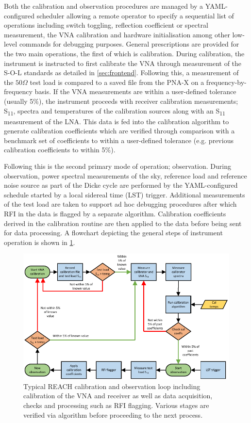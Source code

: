Both the calibration and observation procedures are managed by a YAML-configured scheduler allowing a remote operator to specify a sequential list of operations including switch toggling, reflection coefficient or spectral measurement, the VNA calibration and hardware initialisation among other low-level commands for debugging purposes. General prescriptions are provided for the two main operations, the first of which is calibration. During calibration, the instrument is instructed to first calibrate the VNA through measurement of the S-O-L standards as detailed in \cref{sec:frontend}. Following this, a measurement of the $50 \Omega$ test load is compared to a saved file from the PNA-X on a frequency-by-frequency basis. If the VNA measurements are within a user-defined tolerance (usually 5\%), the instrument proceeds with receiver calibration measurements; S\textsubscript{11}, spectra and temperatures of the calibration sources along with an S\textsubscript{11} measurement of the LNA. This data is fed into the calibration algorithm to generate calibration coefficients which are verified through comparison with a benchmark set of coefficients to within a user-defined tolerance (e.g. previous calibration coefficients to within 5\%).

Following this is the second primary mode of operation; observation. During observation, power spectral measurements of the sky, reference load and reference noise source as part of the Dicke cycle are performed by the YAML-configured schedule started by a local sidereal time (LST) trigger. Additional measurements of the test load are taken to support ad hoc debugging procedures after which RFI in the data is flagged by a separate algorithm. Calibration coefficients derived in the calibration routine are then applied to the data before being sent for data processing. A flowchart depicting the general steps of instrument operation is shown in \cref{fig:obs_flowchart}.
\begin{figure}
    \centering
    \includegraphics[width=\columnwidth]{updated_reach_obs_loop}
    \caption{Typical REACH calibration and observation loop including calibration of the VNA and receiver as well as data acquisition, checks and processing such as RFI flagging. Various stages are verified via algorithm before proceeding to the next process.}
    \label{fig:obs_flowchart}
\end{figure}

